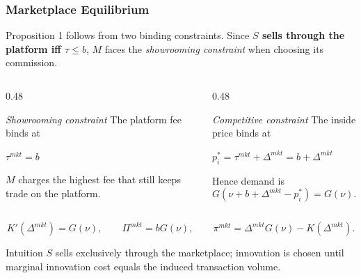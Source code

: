 \begin{frame}
  \frametitle{Marketplace Equilibrium}
  \footnotesize
  Proposition 1 follows from two binding constraints. Since
  \textbf{$S$ sells through the platform iff $\tau\leq b$}, $M$ faces the
  \textit{showrooming constraint} when choosing its commission.

  \begin{columns}[T,onlytextwidth]
    \begin{column}{0.48\textwidth}
      \begin{block}{\textit{Showrooming constraint}}
        The platform fee binds at
        \begin{center}
          \hypertarget{mp_showrooming_src}{%
            \hyperlink{mp_showrooming_deriv}{%
              $\displaystyle \tau^{mkt}=b$}}
        \end{center}
        $M$ charges the highest fee that still keeps trade on the platform.
      \end{block}
    \end{column}

    \begin{column}{0.48\textwidth}
      \begin{block}{\textit{Competitive constraint}}
        The inside price binds at
        \begin{center}
          \hypertarget{mp_competitive_src}{%
            \hyperlink{mp_competitive_deriv}{%
              $\displaystyle p_i^*=\tau^{mkt}+\Delta^{mkt}
              =b+\Delta^{mkt}$}}
        \end{center}
        Hence demand is
        \[
          G(\nu+b+\Delta^{mkt}-p_i^*)=G(\nu).
        \]
      \end{block}
    \end{column}
  \end{columns}

  \vspace{0.1cm}
  \begin{equation*}
    K'(\Delta^{mkt})=G(\nu), \qquad
    \Pi^{mkt}=bG(\nu), \qquad
    \pi^{mkt}=\Delta^{mkt}G(\nu)-K(\Delta^{mkt}).
  \end{equation*}

  \begin{block}{Intuition}
    $S$ sells exclusively through the marketplace; innovation is chosen until
    marginal innovation cost equals the induced transaction volume.
  \end{block}
\end{frame}

